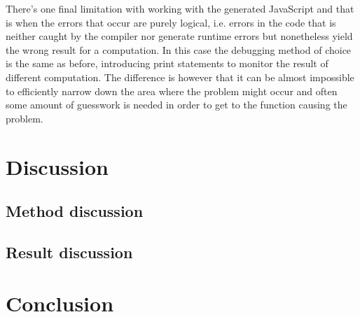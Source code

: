 \documentclass[a4paper]{article}
\begin{document}
There's one final limitation with working with the generated JavaScript and that is when the errors that occur are purely logical, i.e. errors in the code that is neither caught by the compiler nor generate runtime errors but nonetheless yield the wrong result for a computation. In this case the debugging method of choice is the same as before, introducing print statements to monitor the result of different computation. The difference is however that it can be almost impossible to efficiently narrow down the area where the problem might occur and often some amount of guesswork is needed in order to get to the function causing the problem.


\section{Discussion}
\subsection{Method discussion}
\subsection{Result discussion}

\section{Conclusion}
\end{document}
